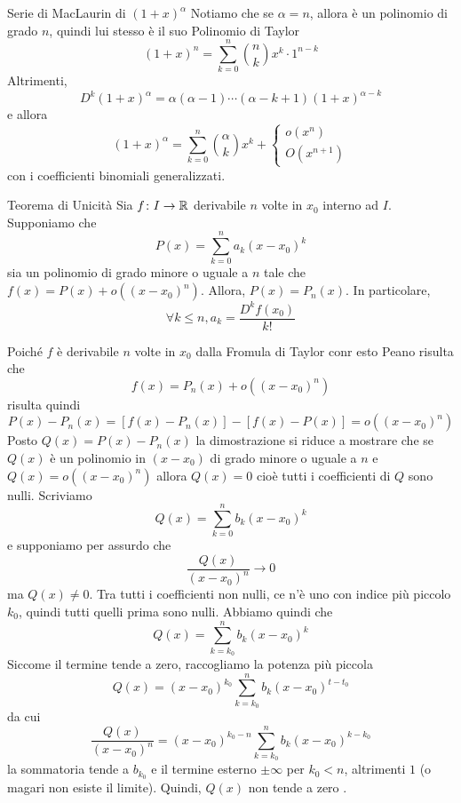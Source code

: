 \documentclass[a4paper]{article}
\begin{document}
\begin{snippetproposition}{Serie di MacLaurin di \({(1+x)}^\alpha\)}
    Notiamo che se \(\alpha = n\), allora è un polinomio di grado \(n\),
    quindi lui stesso è il suo Polinomio di Taylor
    \[
        {(1+x)}^n = \sum_{k=0}^n \binom{n}{k} x^{k} \cdot 1^{n-k}
    \]
    Altrimenti,
    \[
        D^k {(1+x)}^\alpha = \alpha(\alpha - 1) \cdots (\alpha - k + 1) {(1 + x)}^{\alpha - k}
    \]
    e allora
    \[
        {(1+x)}^\alpha = \sum_{k=0}^n \binom{\alpha}{k} x^k + \begin{cases}
            o(x^n) \\
            O(x^{n+1})
        \end{cases}
    \]
    con i coefficienti binomiali generalizzati.
\end{snippetproposition}

\begin{radioactive}
\begin{snippettheorem}{Teorema di Unicità}
    Sia \(f\colon I \to \mathbb{R}\) derivabile \(n\) volte in \(x_0\)
    interno ad \(I\).
    Supponiamo che
    \[
        P(x) = \sum_{k=0}^n a_k {(x-x_0)}^k
    \]
    sia un polinomio di grado minore o uguale a \(n\)
    tale che \(f(x) = P(x) + o({(x-x_0)}^n)\).
    Allora, \(P(x) = P_n(x)\).
    In particolare,
    \[
        \forall k \leq n, a_k = \frac{D^k f(x_0)}{k!}
    \]
\end{snippettheorem}

\begin{snippetproof}{}
    Poiché \(f\) è derivabile \(n\) volte in \(x_0\)
    dalla Fromula di Taylor conr esto Peano risulta che
    \[
        f(x) = P_n(x) +o({(x-x_0)}^n)
    \]
    risulta quindi
    \[
        P(x) - P_n(x) = [f(x) -P_n(x)]
        - [f(x) - P(x)] = o({(x-x_0)}^n)
    \]
    Posto \(Q(x) = P(x) - P_n(x)\) la dimostrazione si riduce a mostrare che se \(Q(x)\)
    è un polinomio in \((x-x_0)\) di grado minore o uguale a \(n\)
    e \(Q(x) = o({(x-x_0)}^n)\) allora \(Q(x) = 0\)
    cioè tutti i coefficienti di \(Q\) sono nulli.
    Scriviamo
    \[
        Q(x) = \sum_{k=0}^n b_k{(x-x_0)}^k
    \]
    e supponiamo per assurdo che
    \[
        \frac{Q(x)}{{(x-x_0)}^n} \to 0
    \]
    ma \(Q(x) \neq 0\).
    Tra tutti i coefficienti non nulli, ce n'è uno con indice più piccolo \(k_0\),
    quindi tutti quelli prima sono nulli.
    Abbiamo quindi che \[
        Q(x) = \sum_{k=k_0}^n b_k {(x-x_0)}^k
    \]
    Siccome il termine tende a zero, raccogliamo la potenza più piccola
    \[
        Q(x) = {(x-x_0)}^{k_0}\sum_{k=k_0}^n b_k {(x-x_0)}^{t-t_0}
    \]
    da cui
    \[
        \frac{Q(x)}{{(x-x_0)}^n} = {(x-x_0)}^{k_0 - n}
        \sum_{k=k_0}^n b_k {(x-x_0)}^{k-k_0}
    \]
    la sommatoria tende a \(b_{k_0}\) e il termine esterno
    \(\pm \infty\) per \(k_0 < n\), altrimenti \(1\) (o magari non esiste il limite).
    Quindi, \(Q(x)\) non tende a zero \lightning.
\end{snippetproof}
\end{radioactive}
\end{document}
